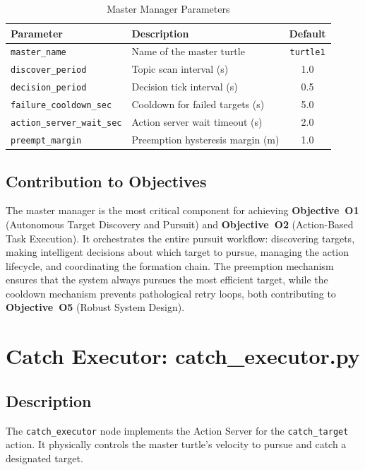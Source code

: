 \begin{table}[htbp]
\centering
\caption{Master Manager Parameters}
\begin{tabular}{llc}
\toprule
\textbf{Parameter} & \textbf{Description} & \textbf{Default} \\
\midrule
\texttt{master\_name} & Name of the master turtle & \texttt{turtle1} \\
\texttt{discover\_period} & Topic scan interval (s) & 1.0 \\
\texttt{decision\_period} & Decision tick interval (s) & 0.5 \\
\texttt{failure\_cooldown\_sec} & Cooldown for failed targets (s) & 5.0 \\
\texttt{action\_server\_wait\_sec} & Action server wait timeout (s) & 2.0 \\
\texttt{preempt\_margin} & Preemption hysteresis margin (m) & 1.0 \\
\bottomrule
\end{tabular}
\end{table}

\subsection{Contribution to Objectives}

The master manager is the most critical component for achieving \textbf{Objective~O1} (Autonomous Target Discovery and Pursuit) and \textbf{Objective~O2} (Action-Based Task Execution). It orchestrates the entire pursuit workflow: discovering targets, making intelligent decisions about which target to pursue, managing the action lifecycle, and coordinating the formation chain. The preemption mechanism ensures that the system always pursues the most efficient target, while the cooldown mechanism prevents pathological retry loops, both contributing to \textbf{Objective~O5} (Robust System Design).

\section{Catch Executor: catch\_executor.py}

\subsection{Description}

The \texttt{catch\_executor} node implements the Action Server for the \texttt{catch\_target} action. It physically controls the master turtle's velocity to pursue and catch a designated target.

